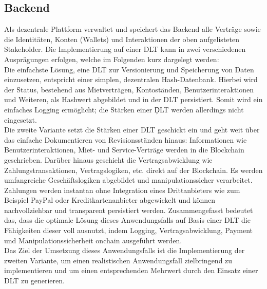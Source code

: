 \subsection{Backend}
\label{subsec:iot_usecase:solution:backend}
Als dezentrale Plattform verwaltet und speichert das Backend alle Verträge sowie die Identitäten, Konten (Wallets) und Interaktionen der oben aufgelisteten Stakeholder. Die Implementierung auf einer \ac{DLT} kann in zwei verschiedenen Ausprägungen erfolgen, welche im Folgenden kurz dargelegt werden:\\
Die einfachste Lösung, eine \ac{DLT} zur Versionierung und Speicherung von Daten einzusetzen, entspricht einer simplen, dezentralen Hash-Datenbank. Hierbei wird der Status, bestehend aus Mietverträgen, Kontoständen, Benutzerinteraktionen und Weiteren, als Hashwert abgebildet und in der \ac{DLT} persistiert. Somit wird ein einfaches Logging ermöglicht; die Stärken einer \c{DLT} werden allerdings nicht eingesetzt.\\
Die zweite Variante setzt die Stärken einer \ac{DLT} geschickt ein und geht weit über das einfache Dokumentieren von Revisionsständen hinaus: Informationen wie Benutzerinteraktionen, Miet- und Service-Verträge werden in die Blockchain geschrieben. Darüber hinaus geschieht die Vertragsabwicklung wie Zahlungstransaktionen, Vertragslogiken, etc. direkt auf der Blockchain. Es werden umfangreiche Geschäftslogiken abgebildet und manipulationssicher verarbeitet. Zahlungen werden instantan ohne Integration eines Drittanbieters wie zum Beispiel PayPal oder Kreditkartenanbieter abgewickelt und können nachvollziehbar und transparent persistiert werden. Zusammengefasst bedeutet das, dass die optimale Lösung dieses Anwendungsfalls auf Basis einer \ac{DLT} die Fähigkeiten dieser voll ausnutzt, indem Logging, Vertragsabwicklung, Payment und Manipulationssicherheit onchain ausgeführt werden.\\
Das Ziel der Umsetzung dieses Anwendungsfalls ist die Implementierung der zweiten Variante, um einen realistischen Anwendungsfall zielbringend zu implementieren und um einen entsprechenden Mehrwert durch den Einsatz einer \ac{DLT} zu generieren.
